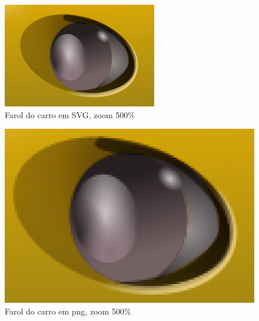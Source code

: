 \begin{figure}[h!]
    \centering
    \caption[Caption for LOF]{Farol do carro em SVG, zoom 500\% \footnotemark}
    \label{fig:farol_carro_svg}
    
    \includegraphics[scale=0.7]{Documeto/1-ElementosTextuais/1-Desenvolvimento/imagens-atividade1/farol_car_svg.png}

    
\end{figure}

\begin{figure}[h!]
    \centering
    \caption[Caption for LOF]{Farol do carro em png, zoom 500\%\footnotemark}
    \label{fig:farol_carro_png}
    
    \includegraphics[scale=0.3]{Documeto/1-ElementosTextuais/1-Desenvolvimento/imagens-atividade1/farol_car_png.png}

    
\end{figure}
